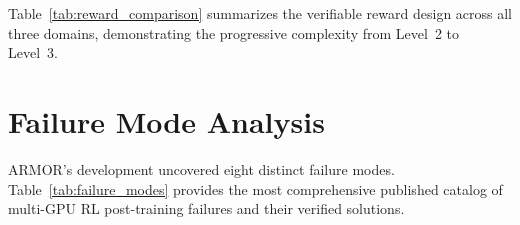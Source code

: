 \documentclass{ieeeaccess}
\begin{document}
Table~\ref{tab:reward_comparison} summarizes the verifiable reward
design across all three domains, demonstrating the progressive
complexity from Level~2 to Level~3.

\begin{table}[t]
\centering
\caption{Cross-Domain Verifiable Reward Design Comparison}
\label{tab:reward_comparison}
\end{table}

\section{Failure Mode Analysis}
\label{sec:analysis}

ARMOR's development uncovered eight distinct failure modes.
Table~\ref{tab:failure_modes} provides the most comprehensive published catalog
of multi-GPU RL post-training failures and their verified solutions.
\end{document}
